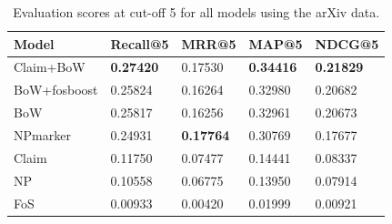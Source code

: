 

\begin{table}[]
\centering
    \caption{Evaluation scores at cut-off 5 for all models using the arXiv data.}
    \label{tab:arxivevalnumbers}
\begin{center}
    \begin{tabular}{lllll}
    \toprule
    Model & Recall@5 & MRR@5 & MAP@5 & NDCG@5 \\
    \midrule
    Claim+BoW & \textbf{0.27420} & 0.17530 & \textbf{0.34416} & \textbf{0.21829} \\
    BoW+fosboost  & 0.25824 & 0.16264 & 0.32980 & 0.20682 \\
    BoW       & 0.25817 & 0.16256 & 0.32961 & 0.20673 \\
    NPmarker  & 0.24931 & \textbf{0.17764} & 0.30769 & 0.17677 \\
    Claim     & 0.11750 & 0.07477 & 0.14441 & 0.08337 \\
    NP        & 0.10558 & 0.06775 & 0.13950 & 0.07914 \\
    FoS       & 0.00933 & 0.00420 & 0.01999 & 0.00921 \\
    \bottomrule
    \end{tabular}
\end{center}
\end{table}

